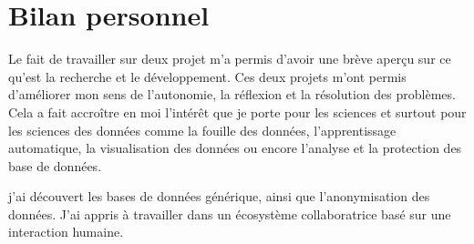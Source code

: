 \section{Bilan personnel}
Le fait de travailler sur deux projet m'a permis d'avoir une brève aperçu sur ce qu'est la recherche et le développement. Ces deux projets m'ont permis d'améliorer mon sens de l’autonomie,  la réflexion et la résolution des problèmes. Cela  a fait accroître en moi l'intérêt que je porte pour les sciences et surtout pour les sciences des données comme la fouille des données, l'apprentissage automatique, la visualisation des données ou encore l'analyse et la protection des base de données.

j'ai découvert les bases de données générique, ainsi que l'anonymisation des données. J'ai appris à travailler dans un écosystème collaboratrice basé sur une interaction humaine.
